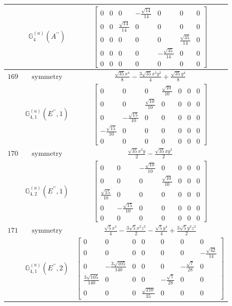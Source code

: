 \documentclass[fleqn,8pt,landscape]{jsarticle}
\begin{document}
\begin{longtable}{ccc}
$  $ & $ \mathbb{G}_{4}^{(a)}(A^{\prime\prime}) $ & $ \begin{bmatrix} 0 & 0 & 0 & - \frac{\sqrt{14}}{14} & 0 & 0 & 0 \\ 0 & 0 & \frac{\sqrt{14}}{14} & 0 & 0 & 0 & 0 \\ 0 & 0 & 0 & 0 & 0 & \frac{\sqrt{35}}{14} & 0 \\ 0 & 0 & 0 & 0 & - \frac{\sqrt{35}}{14} & 0 & 0 \\ 0 & 0 & 0 & 0 & 0 & 0 & 0 \end{bmatrix} $ \\ \hline
$ 169 $ & $ \text{symmetry} $ & $ \frac{\sqrt{35} x^{4}}{8} - \frac{3 \sqrt{35} x^{2} y^{2}}{4} + \frac{\sqrt{35} y^{4}}{8} $ \\
$  $ & $ \mathbb{G}_{4,1}^{(a)}(E^{\prime\prime},1) $ & $ \begin{bmatrix} 0 & 0 & 0 & \frac{\sqrt{10}}{10} & 0 & 0 & 0 \\ 0 & 0 & \frac{\sqrt{10}}{10} & 0 & 0 & 0 & 0 \\ 0 & - \frac{\sqrt{15}}{10} & 0 & 0 & 0 & 0 & 0 \\ - \frac{\sqrt{15}}{10} & 0 & 0 & 0 & 0 & 0 & 0 \\ 0 & 0 & 0 & 0 & 0 & 0 & 0 \end{bmatrix} $ \\ \hline
$ 170 $ & $ \text{symmetry} $ & $ \frac{\sqrt{35} x^{3} y}{2} - \frac{\sqrt{35} x y^{3}}{2} $ \\
$  $ & $ \mathbb{G}_{4,2}^{(a)}(E^{\prime\prime},1) $ & $ \begin{bmatrix} 0 & 0 & - \frac{\sqrt{10}}{10} & 0 & 0 & 0 & 0 \\ 0 & 0 & 0 & \frac{\sqrt{10}}{10} & 0 & 0 & 0 \\ \frac{\sqrt{15}}{10} & 0 & 0 & 0 & 0 & 0 & 0 \\ 0 & - \frac{\sqrt{15}}{10} & 0 & 0 & 0 & 0 & 0 \\ 0 & 0 & 0 & 0 & 0 & 0 & 0 \end{bmatrix} $ \\ \hline
$ 171 $ & $ \text{symmetry} $ & $ \frac{\sqrt{5} x^{4}}{4} - \frac{3 \sqrt{5} x^{2} z^{2}}{2} - \frac{\sqrt{5} y^{4}}{4} + \frac{3 \sqrt{5} y^{2} z^{2}}{2} $ \\
$  $ & $ \mathbb{G}_{4,1}^{(a)}(E^{\prime\prime},2) $ & $ \begin{bmatrix} 0 & 0 & 0 & 0 & 0 & 0 & 0 \\ 0 & 0 & 0 & 0 & 0 & 0 & - \frac{\sqrt{42}}{14} \\ 0 & - \frac{3 \sqrt{105}}{140} & 0 & 0 & 0 & - \frac{\sqrt{7}}{28} & 0 \\ \frac{3 \sqrt{105}}{140} & 0 & 0 & 0 & - \frac{\sqrt{7}}{28} & 0 & 0 \\ 0 & 0 & 0 & \frac{\sqrt{210}}{35} & 0 & 0 & 0 \end{bmatrix} $ \\ \hline

\end{longtable}
\end{document}
